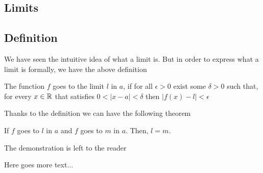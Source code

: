 \begin{center} \section{Limits} \end{center}

\subsection{Definition}

We have seen the intuitive idea of what a limit is. But in order to express what a limit is formally, we have the above definition


\begin{definition}
    The function $f$ goes to the limit $l$ in $a$, if for all $\epsilon > 0$ exist some $\delta > 0$ such that, for every $x \in \mathbb{R}$ that satisfies $0 < |x - a| < \delta$ then $|f(x) - l| < \epsilon$
\end{definition}

Thanks to the definition we can have the following theorem 
\begin{theorem}
    If $f$ goes to $l$ in $a$ and $f$ goes to $m$ in $a$. Then, $l = m$.
\end{theorem}

\begin{demonstration}
    The demonstration is left to the reader
\end{demonstration}

Here goes more text...